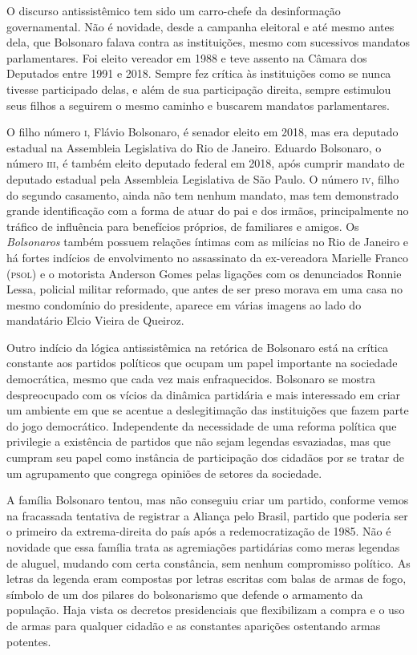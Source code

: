 O discurso antissistêmico tem sido um carro-chefe da desinformação
governamental. Não é novidade, desde a campanha eleitoral e até mesmo
antes dela, que Bolsonaro falava contra as instituições, mesmo com
sucessivos mandatos parlamentares. Foi eleito vereador em 1988 e teve
assento na Câmara dos Deputados entre 1991 e 2018. Sempre fez crítica às
instituições como se nunca tivesse participado delas, e além de sua
participação direita, sempre estimulou seus filhos a seguirem o mesmo
caminho e buscarem mandatos parlamentares.

O filho número \textsc{i}, Flávio Bolsonaro, é senador eleito em 2018, mas era
deputado estadual na Assembleia Legislativa do Rio de Janeiro.
Eduardo Bolsonaro, o número \textsc{iii}, é também eleito deputado federal em 2018,
após cumprir mandato de deputado estadual pela Assembleia Legislativa de São Paulo. 
O número \textsc{iv}, filho do segundo casamento, ainda não
tem nenhum mandato, mas tem demonstrado grande identificação com a forma
de atuar do pai e dos irmãos, principalmente no tráfico de influência
para benefícios próprios, de familiares e amigos. Os \textit{Bolsonaros} também
possuem relações íntimas com as milícias no Rio de Janeiro e há fortes
indícios de envolvimento no assassinato da ex-vereadora Marielle Franco
(\textsc{psol}) e o motorista Anderson Gomes pelas ligações com os denunciados
Ronnie Lessa, policial militar reformado, que antes de ser preso morava em
uma casa no mesmo condomínio do presidente, aparece em várias imagens ao
lado do mandatário Elcio Vieira de Queiroz.

Outro indício da lógica antissistêmica na retórica de Bolsonaro está na
crítica constante aos partidos políticos que ocupam um papel importante
na sociedade democrática, mesmo que cada vez mais enfraquecidos.
Bolsonaro se mostra despreocupado com os vícios da dinâmica partidária e
mais interessado em criar um ambiente em que se acentue a deslegitimação
das instituições que fazem parte do jogo democrático. Independente da
necessidade de uma reforma política que privilegie a existência de
partidos que não sejam legendas esvaziadas, mas que cumpram seu papel
como instância de participação dos cidadãos por se tratar de um
agrupamento que congrega opiniões de setores da sociedade.

A família Bolsonaro tentou, mas não conseguiu criar um partido, conforme
vemos na fracassada tentativa de registrar a Aliança pelo Brasil,
partido que poderia ser o primeiro da extrema-direita do país após a
redemocratização de 1985. Não é novidade que essa família trata as
agremiações partidárias como meras legendas de aluguel, mudando com
certa constância, sem nenhum compromisso político. As letras da legenda
eram compostas por letras escritas com balas de armas de fogo, símbolo
de um dos pilares do bolsonarismo que defende o armamento da população.
Haja vista os decretos presidenciais que flexibilizam a compra e o uso de
armas para qualquer cidadão e as constantes aparições ostentando armas
potentes.


